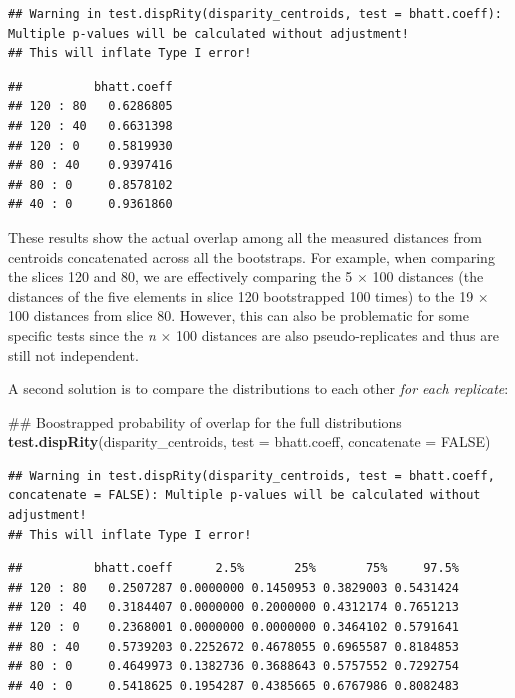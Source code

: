 \documentclass[]{book}
\newenvironment{Shaded}{\begin{snugshade}}{\end{snugshade}}
\newcommand{\KeywordTok}[1]{\textcolor[rgb]{0.13,0.29,0.53}{\textbf{#1}}}
\newcommand{\DataTypeTok}[1]{\textcolor[rgb]{0.13,0.29,0.53}{#1}}
\newcommand{\OtherTok}[1]{\textcolor[rgb]{0.56,0.35,0.01}{#1}}
\newcommand{\NormalTok}[1]{#1}
\theoremstyle{definition}
\theoremstyle{definition}
\theoremstyle{remark}
\begin{document}
\begin{verbatim}
## Warning in test.dispRity(disparity_centroids, test = bhatt.coeff): Multiple p-values will be calculated without adjustment!
## This will inflate Type I error!
\end{verbatim}

\begin{verbatim}
##          bhatt.coeff
## 120 : 80   0.6286805
## 120 : 40   0.6631398
## 120 : 0    0.5819930
## 80 : 40    0.9397416
## 80 : 0     0.8578102
## 40 : 0     0.9361860
\end{verbatim}

These results show the actual overlap among all the measured distances
from centroids concatenated across all the bootstraps. For example, when
comparing the slices 120 and 80, we are effectively comparing the 5
\(\times\) 100 distances (the distances of the five elements in slice
120 bootstrapped 100 times) to the 19 \(\times\) 100 distances from
slice 80. However, this can also be problematic for some specific tests
since the \emph{n} \(\times\) 100 distances are also pseudo-replicates
and thus are still not independent.

A second solution is to compare the distributions to each other
\emph{for each replicate}:

\begin{Shaded}
\begin{Highlighting}[]
\NormalTok{## Boostrapped probability of overlap for the full distributions}
\KeywordTok{test.dispRity}\NormalTok{(disparity_centroids, }\DataTypeTok{test =}\NormalTok{ bhatt.coeff, }\DataTypeTok{concatenate =} \OtherTok{FALSE}\NormalTok{)}
\end{Highlighting}
\end{Shaded}

\begin{verbatim}
## Warning in test.dispRity(disparity_centroids, test = bhatt.coeff, concatenate = FALSE): Multiple p-values will be calculated without adjustment!
## This will inflate Type I error!
\end{verbatim}

\begin{verbatim}
##          bhatt.coeff      2.5%       25%       75%     97.5%
## 120 : 80   0.2507287 0.0000000 0.1450953 0.3829003 0.5431424
## 120 : 40   0.3184407 0.0000000 0.2000000 0.4312174 0.7651213
## 120 : 0    0.2368001 0.0000000 0.0000000 0.3464102 0.5791641
## 80 : 40    0.5739203 0.2252672 0.4678055 0.6965587 0.8184853
## 80 : 0     0.4649973 0.1382736 0.3688643 0.5757552 0.7292754
## 40 : 0     0.5418625 0.1954287 0.4385665 0.6767986 0.8082483
\end{verbatim}
\end{document}
